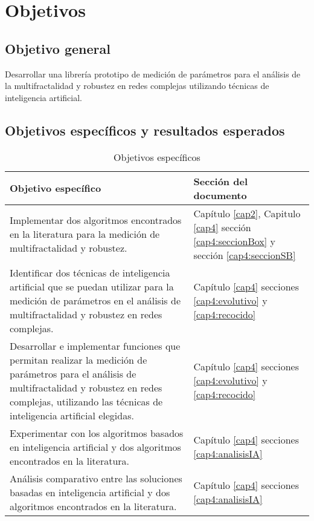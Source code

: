 \section{Objetivos}

\subsection{Objetivo general}

Desarrollar una librería prototipo de medición de parámetros para el análisis de la multifractalidad y robustez en redes complejas utilizando técnicas de inteligencia artificial.

\subsection{Objetivos espec\'ificos y resultados esperados}

\begin{table}[H]
    \centering
    \begin{tabular}{|p{11cm}|p{5cm}|}
        \hline
        \textbf{Objetivo específico} & \textbf{Sección del documento} \\
        \hline
        Implementar dos algoritmos encontrados en la literatura para la medición de multifractalidad y robustez.& Capítulo \ref{cap2}, Capitulo \ref{cap4} sección \ref{cap4:seccionBox} y sección \ref{cap4:seccionSB}\\
        \hline
        Identificar dos técnicas de inteligencia artificial que se puedan utilizar para la medición de parámetros en el análisis de multifractalidad y robustez en redes complejas.&  Capítulo \ref{cap4} secciones \ref{cap4:evolutivo} y \ref{cap4:recocido}\\
        \hline
         Desarrollar e implementar funciones que
permitan realizar la medición de parámetros para el análisis de multifractalidad y robustez en redes complejas, utilizando las técnicas de inteligencia artificial elegidas. &  Capítulo \ref{cap4} secciones \ref{cap4:evolutivo} y \ref{cap4:recocido}\\
        \hline
         Experimentar con los algoritmos basados
en inteligencia artificial y dos algoritmos
encontrados en la literatura.&  Capítulo \ref{cap4} secciones \ref{cap4:analisisIA}
\\
        \hline
        Análisis comparativo entre las soluciones basadas en inteligencia artificial y dos algoritmos encontrados en la literatura.  & Capítulo \ref{cap4} secciones \ref{cap4:analisisIA}\\
        \hline
    \end{tabular}
    \caption{Objetivos específicos}
    \label{tab:objEspecificos}
\end{table}







